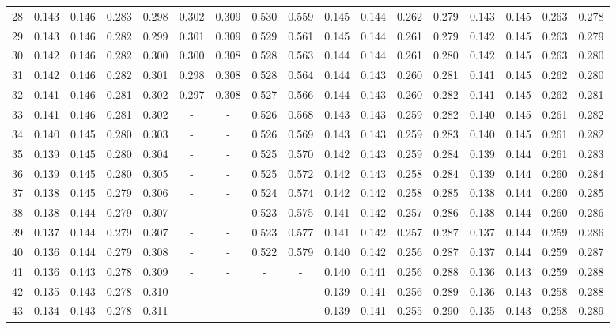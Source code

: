 \documentclass{report}
\begin{document}
\begin{appendices}
\begin{sidewaystable}
\begin{tabular}{|c|cccc|cccc|cccc|cccc|}
28 & 0.143 & 0.146 & 0.283 & 0.298 & 0.302 & 0.309 & 0.530 & 0.559 & 0.145 & 0.144 & 0.262 & 0.279 & 0.143 & 0.145 & 0.263 & 0.278\\
29 & 0.143 & 0.146 & 0.282 & 0.299 & 0.301 & 0.309 & 0.529 & 0.561 & 0.145 & 0.144 & 0.261 & 0.279 & 0.142 & 0.145 & 0.263 & 0.279\\
30 & 0.142 & 0.146 & 0.282 & 0.300 & 0.300 & 0.308 & 0.528 & 0.563 & 0.144 & 0.144 & 0.261 & 0.280 & 0.142 & 0.145 & 0.263 & 0.280\\
31 & 0.142 & 0.146 & 0.282 & 0.301 & 0.298 & 0.308 & 0.528 & 0.564 & 0.144 & 0.143 & 0.260 & 0.281 & 0.141 & 0.145 & 0.262 & 0.280\\
32 & 0.141 & 0.146 & 0.281 & 0.302 & 0.297 & 0.308 & 0.527 & 0.566 & 0.144 & 0.143 & 0.260 & 0.282 & 0.141 & 0.145 & 0.262 & 0.281\\
33 & 0.141 & 0.146 & 0.281 & 0.302 &   -   &   -   & 0.526 & 0.568 & 0.143 & 0.143 & 0.259 & 0.282 & 0.140 & 0.145 & 0.261 & 0.282\\
34 & 0.140 & 0.145 & 0.280 & 0.303 &   -   &   -   & 0.526 & 0.569 & 0.143 & 0.143 & 0.259 & 0.283 & 0.140 & 0.145 & 0.261 & 0.282\\
35 & 0.139 & 0.145 & 0.280 & 0.304 &   -   &   -   & 0.525 & 0.570 & 0.142 & 0.143 & 0.259 & 0.284 & 0.139 & 0.144 & 0.261 & 0.283\\
36 & 0.139 & 0.145 & 0.280 & 0.305 &   -   &   -   & 0.525 & 0.572 & 0.142 & 0.143 & 0.258 & 0.284 & 0.139 & 0.144 & 0.260 & 0.284\\
37 & 0.138 & 0.145 & 0.279 & 0.306 &   -   &   -   & 0.524 & 0.574 & 0.142 & 0.142 & 0.258 & 0.285 & 0.138 & 0.144 & 0.260 & 0.285\\
38 & 0.138 & 0.144 & 0.279 & 0.307 &   -   &   -   & 0.523 & 0.575 & 0.141 & 0.142 & 0.257 & 0.286 & 0.138 & 0.144 & 0.260 & 0.286\\
39 & 0.137 & 0.144 & 0.279 & 0.307 &   -   &   -   & 0.523 & 0.577 & 0.141 & 0.142 & 0.257 & 0.287 & 0.137 & 0.144 & 0.259 & 0.286\\
40 & 0.136 & 0.144 & 0.279 & 0.308 &   -   &   -   & 0.522 & 0.579 & 0.140 & 0.142 & 0.256 & 0.287 & 0.137 & 0.144 & 0.259 & 0.287\\
41 & 0.136 & 0.143 & 0.278 & 0.309 &   -   &   -   &   -   &   -   & 0.140 & 0.141 & 0.256 & 0.288 & 0.136 & 0.143 & 0.259 & 0.288\\
42 & 0.135 & 0.143 & 0.278 & 0.310 &   -   &   -   &   -   &   -   & 0.139 & 0.141 & 0.256 & 0.289 & 0.136 & 0.143 & 0.258 & 0.288\\
43 & 0.134 & 0.143 & 0.278 & 0.311 &   -   &   -   &   -   &   -   & 0.139 & 0.141 & 0.255 & 0.290 & 0.135 & 0.143 & 0.258 & 0.289\\

\end{tabular}
\end{sidewaystable}
\end{appendices}
\end{document}
